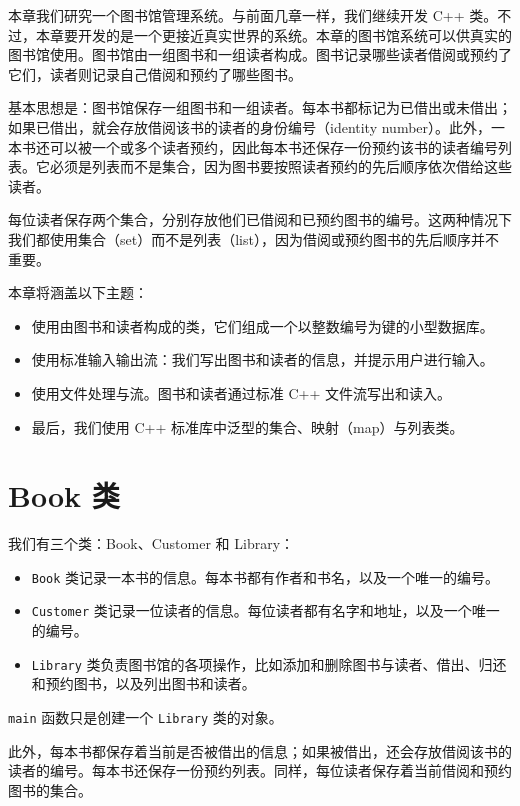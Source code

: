 \renewcommand{\codeInset}{18bp}
本章我们研究一个图书馆管理系统。与前面几章一样，我们继续开发 C++ 类。不过，本章要开发的是一个更接近真实世界的系统。本章的图书馆系统可以供真实的图书馆使用。图书馆由一组图书和一组读者构成。图书记录哪些读者借阅或预约了它们，读者则记录自己借阅和预约了哪些图书。

基本思想是：图书馆保存一组图书和一组读者。每本书都标记为已借出或未借出；如果已借出，就会存放借阅该书的读者的身份编号（identity number）。此外，一本书还可以被一个或多个读者预约，因此每本书还保存一份预约该书的读者编号列表。它必须是列表而不是集合，因为图书要按照读者预约的先后顺序依次借给这些读者。

每位读者保存两个集合，分别存放他们已借阅和已预约图书的编号。这两种情况下我们都使用集合（set）而不是列表（list），因为借阅或预约图书的先后顺序并不重要。

本章将涵盖以下主题：

\begin{itemize}
\item 使用由图书和读者构成的类，它们组成一个以整数编号为键的小型数据库。
\item 使用标准输入输出流：我们写出图书和读者的信息，并提示用户进行输入。
\item 使用文件处理与流。图书和读者通过标准 C++ 文件流写出和读入。
\item 最后，我们使用 C++ 标准库中泛型的集合、映射（map）与列表类。
\end{itemize}

\section{Book 类}

我们有三个类：Book、Customer 和 Library：

\begin{itemize}
\item \texttt{Book} 类记录一本书的信息。每本书都有作者和书名，以及一个唯一的编号。
\item \texttt{Customer} 类记录一位读者的信息。每位读者都有名字和地址，以及一个唯一的编号。
\item \texttt{Library} 类负责图书馆的各项操作，比如添加和删除图书与读者、借出、归还和预约图书，以及列出图书和读者。
\end{itemize}

\texttt{main} 函数只是创建一个 \texttt{Library} 类的对象。

此外，每本书都保存着当前是否被借出的信息；如果被借出，还会存放借阅该书的读者的编号。每本书还保存一份预约列表。同样，每位读者保存着当前借阅和预约图书的集合。

